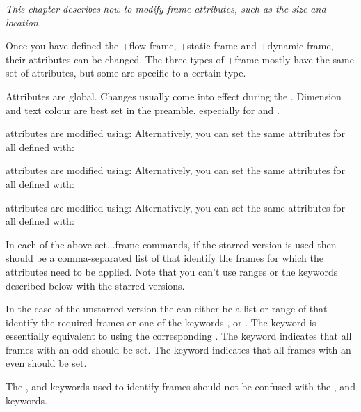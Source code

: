 \documentclass[fontsize=12pt]{scrbook}
\newcommand\chapdesc[1]{\par\emph{#1}\par}
\newcommand{\chapdesc}[1]{%
   \appenddynamiccontents*{chaphead}{\par \normalfont\emph{#1}}%
  }
\begin{document}
\chapdesc{This chapter describes how to modify frame attributes,
such as the size and location.}

Once you have defined the \idxpl+{flow-frame}, \idxpl+{static-frame} and
\idxpl+{dynamic-frame}, their attributes can be changed. The three types of
\idx+{frame} mostly have the same set of attributes, but some are
specific to a certain type.

\begin{important}
Attributes are global. Changes usually come into effect during the
. Dimension and text colour are best set in the
preamble, especially for  and .
\end{important}

 attributes are modified using:
Alternatively, you can set the same attributes for all
defined  with:

 attributes are modified using:
Alternatively, you can set the same attributes for all
defined  with:

 attributes are modified using:
Alternatively, you can set the same attributes for all
defined  with:

In each of the above \gls{set...frame} commands, if the starred 
version is used then  should be a comma-separated list
of  that identify the frames for which the attributes
need to be applied. Note that you can't use ranges or the keywords
described below with the starred versions.

In the case of the unstarred version the
 can either be a list or range of  that
identify the required frames or one of the
keywords ,  or .
The  keyword is essentially equivalent to using the
corresponding . The 
keyword indicates that all frames with an odd  should be
set. The  keyword indicates that all frames with an
even  should be set.

\begin{important}
The ,  and  keywords
used to identify frames should not be confused with the
,  and   keywords.
\end{important}
\end{document}
